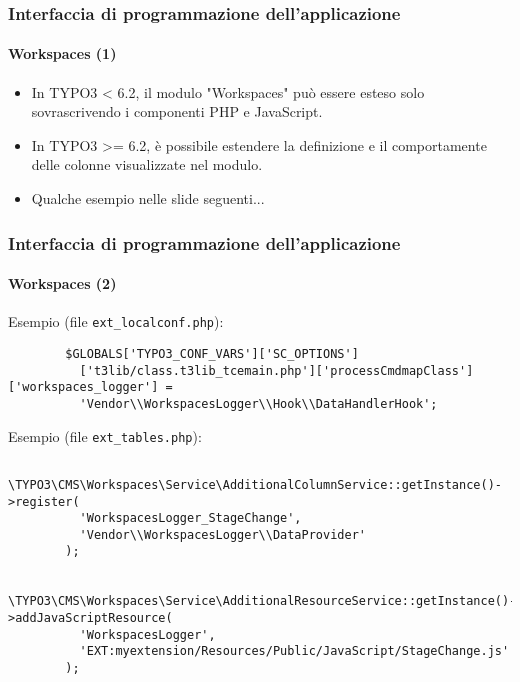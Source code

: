 
\begin{frame}[fragile]
	\frametitle{Interfaccia di programmazione dell'applicazione}
	\framesubtitle{Workspaces (1)}

	\begin{itemize}
		\item In TYPO3 < 6.2, il modulo "Workspaces" può essere esteso solo sovrascrivendo i componenti PHP e JavaScript.
		\item In TYPO3 >= 6.2, è possibile estendere la definizione e il comportamente delle colonne visualizzate nel modulo.
		\item Qualche esempio nelle slide seguenti...
	\end{itemize}

\end{frame}


\begin{frame}[fragile]
	\frametitle{Interfaccia di programmazione dell'applicazione}
	\framesubtitle{Workspaces (2)}

	\lstset{
		basicstyle=\tiny\ttfamily
	}

	Esempio (file \texttt{ext\_localconf.php}):

	\begin{lstlisting}
		$GLOBALS['TYPO3_CONF_VARS']['SC_OPTIONS']
		  ['t3lib/class.t3lib_tcemain.php']['processCmdmapClass']['workspaces_logger'] =
		  'Vendor\\WorkspacesLogger\\Hook\\DataHandlerHook';
	\end{lstlisting}

	Esempio (file \texttt{ext\_tables.php}):

	\begin{lstlisting}
		\TYPO3\CMS\Workspaces\Service\AdditionalColumnService::getInstance()->register(
		  'WorkspacesLogger_StageChange',
		  'Vendor\\WorkspacesLogger\\DataProvider'
		);

		\TYPO3\CMS\Workspaces\Service\AdditionalResourceService::getInstance()->addJavaScriptResource(
		  'WorkspacesLogger',
		  'EXT:myextension/Resources/Public/JavaScript/StageChange.js'
		);
	\end{lstlisting}

\end{frame}

